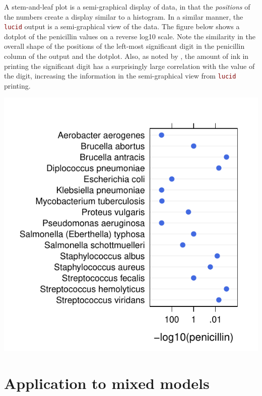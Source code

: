 \documentclass[12pt]{article}\usepackage[]{graphicx}\usepackage[]{color}
\makeatletter
\def\maxwidth{ %
  \ifdim\Gin@nat@width>\linewidth
    \linewidth
  \else
    \Gin@nat@width
  \fi
}
\newenvironment{knitrout}{}{} %
\newcommand{\code}[1]{\texttt{\textcolor{maroon}{#1}}}
\makeatother
\begin{document}
A stem-and-leaf plot is a semi-graphical display of data, in that the
{\it positions} of the numbers create a display similar to a histogram.
In a similar manner, the \code{lucid} output is a semi-graphical view
of the data.
The figure below shows a dotplot of the penicillin values on a
reverse log10 scale.
Note the similarity in the overall shape of the positions
of the left-most significant digit in the penicillin column of the
output and the dotplot.
Also, as noted by \cite{gelman2011tables}, the amount of ink in printing
the significant digit has a surprisingly large correlation with the value
of the digit, increasing the information in the semi-graphical view
from \code{lucid} printing.
\begin{knitrout}
\color{fgcolor}

{\centering \includegraphics[width=\maxwidth]{figure/unnamed-chunk-5-1} 

}



\end{knitrout}



\section{Application to mixed models}
\end{document}
